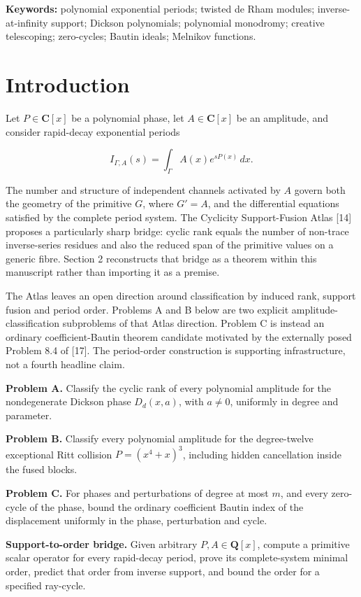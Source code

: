 \documentclass[
  11pt,
  a4paper,
]{amsart}
\begin{document}
\noindent\textbf{Keywords:} polynomial exponential periods; twisted de Rham modules; inverse-at-infinity support; Dickson polynomials; polynomial monodromy; creative telescoping; zero-cycles; Bautin ideals; Melnikov functions.

\section{Introduction}

Let \(P\in\mathbf C[x]\) be a polynomial phase, let \(A\in\mathbf C[x]\)
be an amplitude, and consider rapid-decay exponential periods

\[
I_{\Gamma,A}(s)=\int_\Gamma A(x)e^{sP(x)}\,dx.
\]

The number and structure of independent channels activated by \(A\)
govern both the geometry of the primitive \(G\), where \(G'=A\), and the
differential equations satisfied by the complete period system. The
Cyclicity Support-Fusion Atlas {[}14{]} proposes a particularly sharp
bridge: cyclic rank equals the number of non-trace inverse-series
residues and also the reduced span of the primitive values on a generic
fibre. Section 2 reconstructs that bridge as a theorem within this
manuscript rather than importing it as a premise.

The Atlas leaves an open direction around classification by induced
rank, support fusion and period order. Problems A and B below are two
explicit amplitude-classification subproblems of that Atlas direction.
Problem C is instead an ordinary coefficient-Bautin theorem candidate
motivated by the externally posed Problem 8.4 of {[}17{]}. The
period-order construction is supporting infrastructure, not a fourth
headline claim.

\textbf{Problem A.} Classify the cyclic rank of every polynomial
amplitude for the nondegenerate Dickson phase \(D_d(x,a)\), with
\(a\ne0\), uniformly in degree and parameter.

\textbf{Problem B.} Classify every polynomial amplitude for the
degree-twelve exceptional Ritt collision \(P=(x^4+x)^3\), including
hidden cancellation inside the fused blocks.

\textbf{Problem C.} For phases and perturbations of degree at most
\(m\), and every zero-cycle of the phase, bound the ordinary coefficient
Bautin index of the displacement uniformly in the phase, perturbation
and cycle.

\textbf{Support-to-order bridge.} Given arbitrary
\(P,A\in\mathbf Q[x]\), compute a primitive scalar operator for every
rapid-decay period, prove its complete-system minimal order, predict
that order from inverse support, and bound the order for a specified
ray-cycle.
\end{document}
